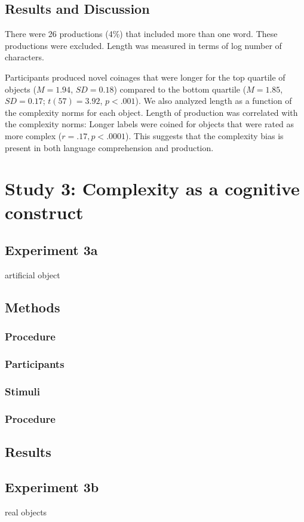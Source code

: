 \documentclass[man]{apa2}
\begin{document}
\subsection{Results and Discussion}
There were 26 productions (4\%) that included more than one word. These productions were excluded. Length was measured in terms of log number of characters.

Participants produced novel coinages that were longer for the top quartile of objects  ($M = 1.94$, $SD = 0.18$) compared to the bottom quartile ($M = 1.85$, $SD = 0.17$; $t(57) = 3.92$,  $p < .001$). We also analyzed length as a function of the complexity norms for each object. Length of production was correlated with the complexity norms: Longer labels were coined for objects that were rated as more complex ($r=.17, p<.0001$). This suggests that the complexity bias is present in both language comprehension and production. 


\section{Study 3: Complexity as a cognitive construct}

\subsection{\textbf{Experiment 3a}}
artificial object
\subsection{Methods}
\subsubsection{Procedure}
\subsubsection{Participants}
\subsubsection{Stimuli}
\subsubsection{Procedure}
\subsection{Results}

\subsection{\textbf{Experiment 3b}}
real objects
\end{document}
